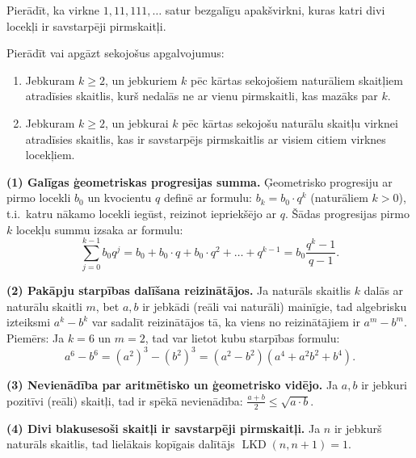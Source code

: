 \documentclass[a4paper,12pt]{article}
\begin{document}
\begin{problem}
\vspace{20pt}
\begin{problem}
Pierādīt, ka virkne $1,11,111,\ldots$ satur bezgalīgu apakšvirkni,
kuras katri divi locekļi ir savstarpēji pirmskaitļi.
\end{problem}



\vspace{20pt}
\begin{problem}
Pierādīt vai apgāzt sekojošus apgalvojumus:
\begin{enumerate}
\item Jebkuram $k \geq 2$, un jebkuriem $k$ pēc kārtas sekojošiem naturāliem 
skaitļiem atradīsies skaitlis, kurš nedalās ne ar vienu pirmskaitli, kas mazāks par $k$.   
\item Jebkuram $k \geq 2$, un jebkurai $k$ pēc kārtas sekojošu naturālu skaitļu virknei atradīsies skaitlis, kas ir savstarpējs pirmskaitlis ar visiem citiem virknes locekļiem. 
\end{enumerate}
\end{problem}

\newpage


{\bf (1) Galīgas ģeometriskas progresijas summa.} Ģeometrisko progresiju ar pirmo locekli $b_0$ 
un kvocientu $q$ definē ar formulu: $b_k = b_0 \cdot q^k$ (naturāliem $k>0$), t.i.\ katru nākamo locekli 
iegūst, reizinot iepriekšējo ar $q$. Šādas progresijas pirmo $k$ locekļu summu izsaka ar formulu:
$$\sum\limits_{j=0}^{k-1} b_0 q^j = b_0 + b_0 \cdot q + b_0 \cdot q^2 + \ldots + q^{k-1} = b_0 \frac{q^k-1}{q-1}.$$

{\bf (2) Pakāpju starpības dalīšana reizinātājos.} 
Ja naturāls skaitlis $k$ dalās ar naturālu skaitli $m$, bet $a,b$ ir jebkādi (reāli vai naturāli) mainīgie, 
tad algebrisku izteiksmi $a^k - b^k$ var sadalīt reizinātājos tā, ka viens no reizinātājiem ir $a^m - b^m$.\\
Piemērs: Ja $k = 6$ un $m=2$, tad var lietot kubu starpības formulu:
$$a^6 - b^6 = (a^2)^3 - (b^2)^3 = \left(a^2 - b^2\right)\left(a^4 + a^2b^2 + b^4\right).$$

{\bf (3) Nevienādība par aritmētisko un ģeometrisko vidējo.}
Ja $a,b$ ir jebkuri pozitīvi (reāli) skaitļi, tad ir spēkā nevienādība:
${\displaystyle \frac{a+b}{2} \leq \sqrt{a \cdot b}}$.

{\bf (4) Divi blakusesoši skaitļi ir savstarpēji pirmskaitļi.}
Ja $n$ ir jebkurš naturāls skaitlis, tad lielākais kopīgais dalītājs $\operatorname{LKD}(n,n+1) = 1$.


\end{problem}
\end{document}
